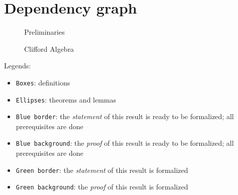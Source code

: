 \section{Dependency graph}

\begin{figure}[H]
    \centering
    {
    \begin{dot2tex}[dot,file=dep_graph_1]
    \end{dot2tex}
    }
    \caption{Preliminaries}
    \label{fig:dep_graph_1}
\end{figure}

\begin{figure}[H]
    \centering
    {
    \begin{dot2tex}[dot,file=dep_graph_2]
    \end{dot2tex}
    }
    \caption{Clifford Algebra}
    \label{fig:dep_graph_2}
\end{figure}

Legends:

\begin{itemize}
    \item \texttt{Boxes}: definitions
    \item \texttt{Ellipses}: theorems and lemmas
    \item \texttt{Blue border}: the \emph{statement} of this result is ready to be formalized; all prerequisites are done
    \item \texttt{Blue background}: the \emph{proof} of this result is ready to be formalized; all prerequisites are done
    \item \texttt{Green border}:  the \emph{statement} of this result is formalized
    \item \texttt{Green background}: the \emph{proof} of this result is formalized
\end{itemize}